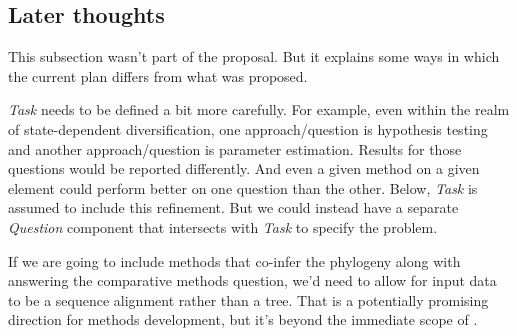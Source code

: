 


\subsection{Later thoughts}

This subsection wasn't part of the proposal.
But it explains some ways in which the current plan differs from what was proposed.

\bigskip

\textit{Task} needs to be defined a bit more carefully.
For example, even within the realm of state-dependent diversification, one approach/question is hypothesis testing and another approach/question is parameter estimation.
Results for those questions would be reported differently.
And even a given method on a given element could perform better on one question than the other.
Below, \textit{Task} is assumed to include this refinement.
But we could instead have a separate \textit{Question} component that intersects with \textit{Task} to specify the problem.

If we are going to include methods that co-infer the phylogeny along with answering the comparative methods question, we'd need to allow for input data to be a sequence alignment rather than a tree.
That is a potentially promising direction for methods development, but it's beyond the immediate scope of \phycomb.
